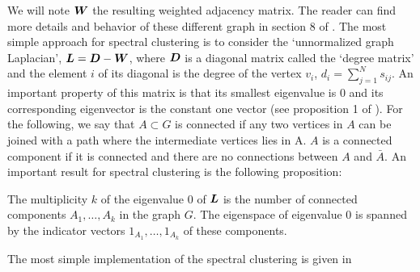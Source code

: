 We will note $\boldsymbol W$ the resulting weighted adjacency matrix. The reader can find more details and behavior of these different graph in section 8 of \citep{Luxburg:2007:TSC:1288822.1288832}. The most simple approach for spectral clustering is to consider the `unnormalized graph Laplacian', $\boldsymbol L=\boldsymbol D-\boldsymbol W$, where $\boldsymbol D$ is a diagonal matrix called the `degree matrix' and the element $i$ of its diagonal is the degree of the vertex $v_i$, $d_i= \sum_{j=1}^Ns_{ij}$. An important property of this matrix is that its smallest eigenvalue is 0 and its corresponding eigenvector is the constant one vector (see proposition 1 of \citep{Luxburg:2007:TSC:1288822.1288832}). For the following, we say that $A \subset G$ is connected if any two vertices in $A$ can be joined with a path where the intermediate vertices lies in A. $A$ is a connected component if it is connected and there are no connections between $A$ and $\bar A$. An important result for spectral clustering is the following proposition:
\begin{proposition}
 The multiplicity $k$ of the eigenvalue 0 of $\boldsymbol L$ is the number of connected components $A_1,\dots,A_k$ in the graph $G$. The eigenspace of eigenvalue 0 is spanned by the indicator vectors $1_{A_1},\dots,1_{A_k}$ of these components.
 \end{proposition}
 The most simple implementation of the spectral clustering is given in 

